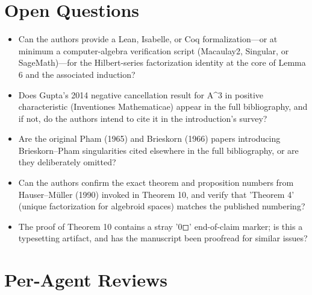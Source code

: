 \documentclass[11pt]{article}
\begin{document}
\section*{Open Questions}
\begin{itemize}[leftmargin=*]
  \item Can the authors provide a Lean, Isabelle, or Coq formalization---or at minimum a computer-algebra verification script (Macaulay2, Singular, or SageMath)---for the Hilbert-series factorization identity at the core of Lemma 6 and the associated induction?
  \item Does Gupta's 2014 negative cancellation result for A\^{}3 in positive characteristic (Inventiones Mathematicae) appear in the full bibliography, and if not, do the authors intend to cite it in the introduction's survey?
  \item Are the original Pham (1965) and Brieskorn (1966) papers introducing Brieskorn--Pham singularities cited elsewhere in the full bibliography, or are they deliberately omitted?
  \item Can the authors confirm the exact theorem and proposition numbers from Hauser--Müller (1990) invoked in Theorem 10, and verify that 'Theorem 4' (unique factorization for algebroid spaces) matches the published numbering?
  \item The proof of Theorem 10 contains a stray '0◻' end-of-claim marker; is this a typesetting artifact, and has the manuscript been proofread for similar issues?
\end{itemize}

\section*{Per-Agent Reviews}
\end{document}
